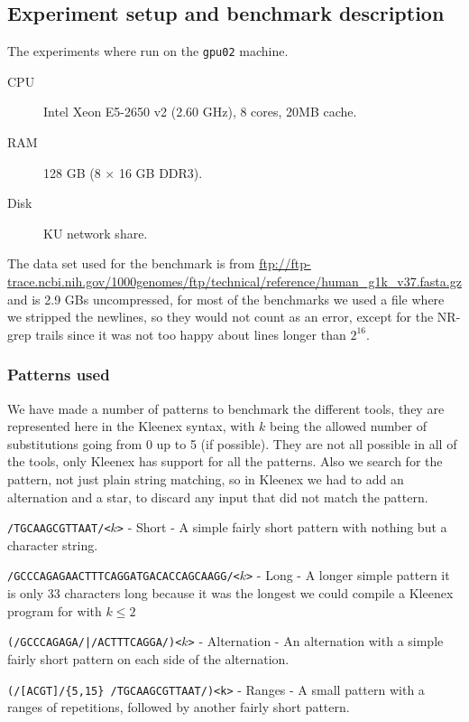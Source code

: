 \subsection{Experiment setup and benchmark description}
The experiments where run on the \texttt{gpu02} machine.
\begin{description}
    \item[CPU] Intel Xeon E5-2650 v2 (2.60 GHz), 8 cores, 20MB cache.
    \item[RAM] 128 GB (8 $\times$ 16 GB DDR3).
    \item[Disk] KU network share.
\end{description}

The data set used for the benchmark is from
\url{ftp://ftp-trace.ncbi.nih.gov/1000genomes/ftp/technical/reference/human_g1k_v37.fasta.gz}
and is 2.9 GBs uncompressed, for most of the benchmarks we used a file where we
stripped the newlines, so they would not count as an error, except for the
NR-grep trails since it was not too happy about lines longer than $2^{16}$.

\subsubsection{Patterns used}
We have made a number of patterns to benchmark the different tools, they are
represented here in the Kleenex syntax, with $k$ being the allowed number of
substitutions going from 0 up to 5 (if possible). They are not all possible in
all of the tools, only Kleenex has support for all the patterns. Also we search
for the pattern, not just plain string matching, so in Kleenex we had to add an
alternation and a star, to discard any input that did not match the pattern.

\texttt{/TGCAAGCGTTAAT/<$k$>} - Short - A simple fairly short pattern with
nothing but a character string.

\texttt{/GCCCAGAGAACTTTCAGGATGACACCAGCAAGG/<$k$>} - Long - A longer simple
pattern it is only 33 characters long because it was the longest we could
compile a Kleenex program for with $k \leq 2$

\texttt{(/GCCCAGAGA/|/ACTTTCAGGA/)<$k$>} - Alternation - An alternation with a
simple fairly short pattern on each side of the alternation.

\texttt{(/[ACGT]/\{5,15\} /TGCAAGCGTTAAT/)<k>} - Ranges - A small pattern with
a ranges of repetitions, followed by another fairly short pattern.

